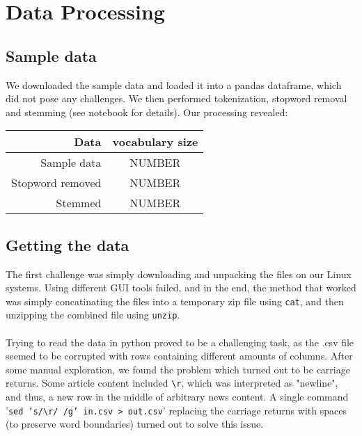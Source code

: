 \documentclass{article}
\begin{document}
\maketitle





\section{Data Processing}
\subsection{Sample data}
We downloaded the sample data and loaded it into a pandas dataframe, which did not pose any challenges. 
We then performed tokenization, stopword removal and stemming (see notebook for details). Our processing revealed:
\begin{table}[h]
    \centering
    \begin{tabular}{r| c}
        Data& vocabulary size\\
        \hline
    Sample data& NUMBER \\
    \hline
    Stopword removed & NUMBER \\
    \hline
    Stemmed & NUMBER
    \end{tabular}
\end{table}
\label{sec:headings}
\subsection{Getting the data}
The first challenge was simply downloading and unpacking the files on our Linux systems. Using different GUI tools failed, and in the end, the method that worked was simply concatinating the files into a temporary zip file using \texttt{cat}, and then unzipping the combined file using \texttt{unzip}.\\
\\
Trying to read the data in python proved to be a challenging task, as the .csv file seemed to be corrupted with rows containing different amounts of columns. After some manual exploration, we found the problem which turned out to be carriage returns. Some article content included \texttt{\textbackslash r}, which was interpreted as "newline", and thus, a new row in the middle of arbitrary news content. A single command '\texttt{sed 's/\textbackslash r/ /g' in.csv > out.csv}' replacing the carriage returns with spaces (to preserve word boundaries) turned out to solve this issue.\\
\end{document}
